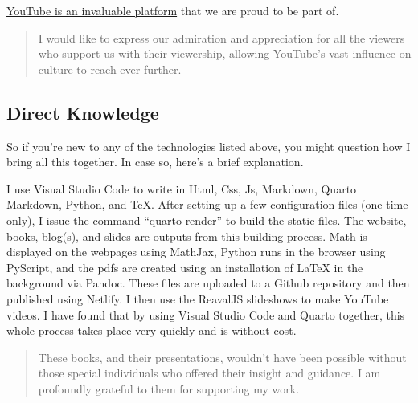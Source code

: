 \documentclass[
  twoside,
  12pt,
  letterpaper,
  fleqn]{article}
\begin{document}
\href{https://about.youtube}{YouTube is an invaluable platform} that we
are proud to be part of.

\begin{quote}
I would like to express our admiration and appreciation for all the
viewers who support us with their viewership, allowing YouTube's vast
influence on culture to reach ever further.
\end{quote}

\hypertarget{direct-knowledge}{%
\subsection{Direct Knowledge}\label{direct-knowledge}}

So if you're new to any of the technologies listed above, you might
question how I bring all this together. In case so, here's a brief
explanation.

I use Visual Studio Code to write in Html, Css, Js, Markdown, Quarto
Markdown, Python, and TeX. After setting up a few configuration files
(one-time only), I issue the command ``quarto render'' to build the
static files. The website, books, blog(s), and slides are outputs from
this building process. Math is displayed on the webpages using MathJax,
Python runs in the browser using PyScript, and the pdfs are created
using an installation of LaTeX in the background via Pandoc. These files
are uploaded to a Github repository and then published using Netlify. I
then use the ReavalJS slideshows to make YouTube videos. I have found
that by using Visual Studio Code and Quarto together, this whole process
takes place very quickly and is without cost.

\begin{quote}
These books, and their presentations, wouldn't have been possible
without those special individuals who offered their insight and
guidance. I am profoundly grateful to them for supporting my work.
\end{quote}


\printbibliography



\thispagestyle{empty}
\end{document}
